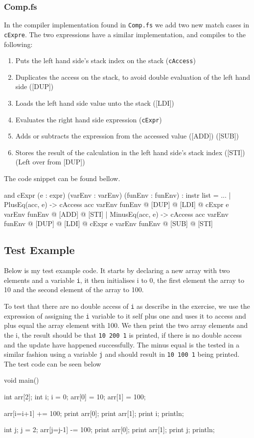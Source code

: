 \subsubsection*{Comp.fs}
In the compiler implementation found in \texttt{Comp.fs} we add two new match
cases in \texttt{cExpre}. The two expressions have a similar implementation, and
compiles to the following:
\begin{enumerate}
    \item Puts the left hand side's stack index on the stack (\texttt{cAccess})
    \item Duplicates the access on the stack, to avoid double evaluation of the
        left hand side ([DUP])
    \item Loads the left hand side value unto the stack ([LDI])
    \item Evaluates the right hand side expression (\texttt{cExpr})
    \item Adds or subtracts the expression from the accessed value ([ADD])
        ([SUB]) 
    \item Stores the result of the calculation in the left hand side's stack
        index ([STI]) (Left over from [DUP])
\end{enumerate}
The code snippet can be found bellow.
\begin{fs}
and cExpr (e : expr) (varEnv : varEnv) (funEnv : funEnv) : instr list = 
...
    | PlusEq(acc, e)  -> cAccess acc varEnv funEnv @ [DUP] @ [LDI] @ cExpr e varEnv funEnv @ [ADD] @ [STI]
    | MinusEq(acc, e)  -> cAccess acc varEnv funEnv @ [DUP] @ [LDI] @ cExpr e varEnv funEnv @ [SUB] @ [STI]
\end{fs}

\subsection{Test Example}
Below is my test example code. It starts by declaring a new array with two
elements and a variable \texttt{i}, it then initialises i to 0, the first element the
array to 10 and the second element of the array to 100.

To test that there are no double access of \texttt{i} as describe in the
exercise, we use the expression of assigning the \texttt{i} variable to it self
plus one and uses it to access and plus equal the array element with 100. We
then print the two array elements and the i, the result should be that
\texttt{10 200 1} is printed, if there is no double access and the update have
happened successfully. The minus equal is the tested in a similar fashion using
a variable \texttt{j} and should result in \texttt{10 100 1} being printed. The
test code can be seen below
\begin{ccode}
void main() {
    int arr[2];
    int i;
    i = 0;
    arr[0] = 10;
    arr[1] = 100;
    
    arr[i=i+1] += 100;
    print arr[0];
    print arr[1];
    print i;
    println;

    int j;
    j = 2;
    arr[j=j-1] -= 100;
    print arr[0];
    print arr[1];
    print j;
    println;
}
\end{ccode}
